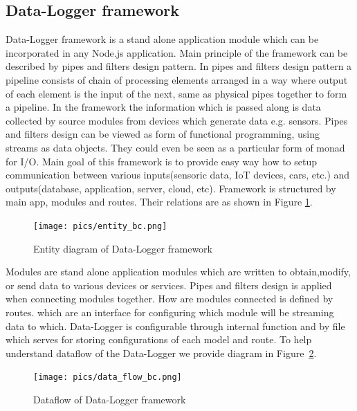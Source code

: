\subsection{Data-Logger framework} %
Data-Logger framework is a stand alone application module which can be incorporated in any Node.js application. Main principle of the framework can be described by pipes and filters design pattern. In pipes and filters design pattern a pipeline consists of chain of processing elements arranged in a way where output of each element is the input of the next, same as physical pipes together to form a pipeline. In the framework the information which is passed along is data collected by source modules from devices which generate data e.g. sensors. Pipes and filters design can be viewed as form of functional programming, using streams as data objects. They could even be seen as a particular form of monad for I/O\cite{monad_pipe}. Main goal of this framework is to provide easy way how to setup communication between various inputs(sensoric data, IoT devices, cars, etc.) and outputs(database, application, server, cloud, etc). Framework is structured by main app, modules and routes. Their relations are as shown in Figure \ref{fig:entity_pc}.
\begin{figure}[H]
\begin{center}
\captionsetup{font=small}
\texttt{[image: pics/entity\_bc.png]}
\caption{Entity diagram of Data-Logger framework}
\label{fig:entity_pc}
\end{center}
\end{figure}
 Modules are stand alone application modules which are written to obtain,modify, or send data to various devices or services. Pipes and filters design is applied when connecting modules together. How are modules connected is defined by routes. which are an interface for configuring which module will be streaming data to which. Data-Logger is configurable through internal function and by file which serves for storing configurations of each model and route. To help understand dataflow of the Data-Logger we provide diagram in Figure~\ref{fig:dataflow}.
 \begin{figure}[H]
\begin{center}
\captionsetup{font=small}
\texttt{[image: pics/data\_flow\_bc.png]}
\caption{Dataflow of Data-Logger framework}
\label{fig:dataflow}
\end{center}
\end{figure}
